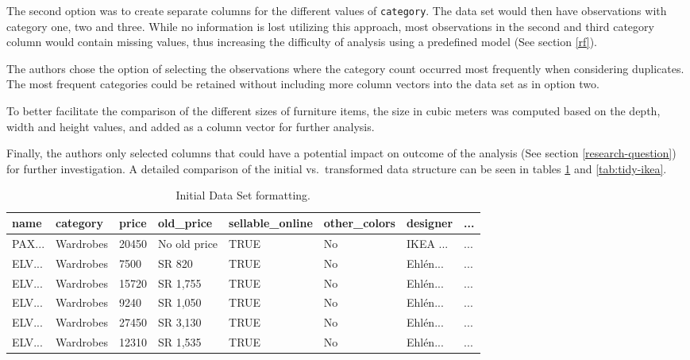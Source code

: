 \documentclass[a4paper, nobind]{templates/ociamthesis}
\begin{document}
The second option was to create separate columns for the different values of \texttt{category}. The data set would then have observations with category one, two and three. While no information is lost utilizing this approach, most observations in the second and third category column would contain missing values, thus increasing the difficulty of analysis using a predefined model (See section \ref{rf}).

The authors chose the option of selecting the observations where the category count occurred most frequently when considering duplicates. The most frequent categories could be retained without including more column vectors into the data set as in option two.

To better facilitate the comparison of the different sizes of furniture items, the size in cubic meters was computed based on the depth, width and height values, and added as a column vector for further analysis.

Finally, the authors only selected columns that could have a potential impact on outcome of the analysis (See section \ref{research-question}) for further investigation. A detailed comparison of the initial vs.~transformed data structure can be seen in tables \ref{tab:initial-ikea} and \ref{tab:tidy-ikea}.

\begin{table}

\caption{\label{tab:initial-ikea}Initial Data Set formatting.}
\centering
\fontsize{8}{10}\selectfont
\begin{tabular}[t]{l|l|l|l|l|l|l|l}
\hline
name & category & price & old\_price & sellable\_online & other\_colors & designer & ...\\
\hline
PAX... & Wardrobes & 20450 & No old price & TRUE & No & IKEA ... & ...\\
\hline
ELV... & Wardrobes & 7500 & SR 820 & TRUE & No & Ehlén... & ...\\
\hline
ELV... & Wardrobes & 15720 & SR 1,755 & TRUE & No & Ehlén... & ...\\
\hline
ELV... & Wardrobes & 9240 & SR 1,050 & TRUE & No & Ehlén... & ...\\
\hline
ELV... & Wardrobes & 27450 & SR 3,130 & TRUE & No & Ehlén... & ...\\
\hline
ELV... & Wardrobes & 12310 & SR 1,535 & TRUE & No & Ehlén... & ...\\
\hline
\end{tabular}
\end{table}
\end{document}
